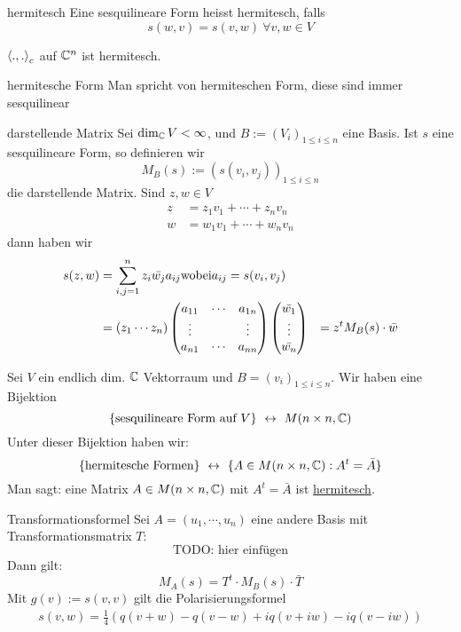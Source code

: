 \begin{Def}{hermitesch}
  Eine sesquilineare Form heisst hermitesch, falls
  \[s(w,v)=s(v,w)\ \forall v,w\in V\]
\end{Def}
\begin{Bsp}
  $\left\langle .,. \right\rangle_c$ auf $\mathbb{C}^n$ ist hermitesch.
\end{Bsp}
\begin{Bem}{hermitesche Form}
  Man spricht von hermiteschen Form, diese sind immer sesquilinear
\end{Bem}
\begin{Def}{darstellende Matrix}
  Sei $\dim_{\mathbb{C}} V < \infty$, und $B:=(V_i)_{1\leq i \leq n}$ eine Basis. Ist $s$ eine sesquilineare Form, so definieren wir
  \[M_B(s):=\left( s(v_i,v_j) \right)_{1\leq i \leq n}\]
  die darstellende Matrix. Sind $z,w\in V$
  \begin{align*}
    z&= z_1v_1+\cdots+z_nv_n\\
    w&= w_1v_1+\cdots+w_nv_n
  \end{align*}
  dann haben wir
  \begin{align*}
    s(z,w)&=\sum^n_{i,j=1}z_i\bar{w_j}a_{ij} \text{wobei} a_{ij} = s(v_i,v_j)\\
    &= (z_1\cdots z_n)\begin{pmatrix}a_{11}&\cdots&a_{1n}\\ \vdots & & \vdots \\ a_{n1} & \cdots & a_{nn}\end{pmatrix} \begin{pmatrix}\bar{w_1} \\ \vdots \\ \bar{w_n}\end{pmatrix}
    &=  z^t M_B(s)\cdot \bar{w}
  \end{align*}
\end{Def}
\begin{Prop}
  Sei $V$ ein endlich dim. $\mathbb{C}$ Vektorraum und $B=(v_i)_{1\leq i \leq n}$. Wir haben eine Bijektion
  \[\{\text{sesquilineare Form auf $V$}\}\ \lra\ M(n\times n, \mb{C})\]
  Unter dieser Bijektion haben wir:
  \[\{\text{hermitesche Formen}\}\ \leftrightarrow\ \{A\in M(n\times n, \mathbb{C}): A^t=\bar{A}\}\]
  Man sagt: eine Matrix $A\in M(n\times n, \mathbb{C})$ mit $A^t=\bar{A}$ ist \underline{hermitesch}.
\end{Prop}
\begin{Sat}{Transformationsformel}
  Sei $A=(u_1,\cdots,u_n)$ eine andere Basis mit Transformationsmatrix $T$:
  \[\text{TODO: hier einfügen}\]
  Dann gilt: 
  \[M_A(s)=T^t\cdot M_B(s)\cdot \bar{T}\]
  Mit $g(v):=s(v,v)$ gilt die Polarisierungsformel
  \begin{align*}
    s(v,w)=\frac{1}{4}\left( q(v+w)-q(v-w)+iq(v+iw)-iq(v-iw) \right)
  \end{align*}
\end{Sat}
